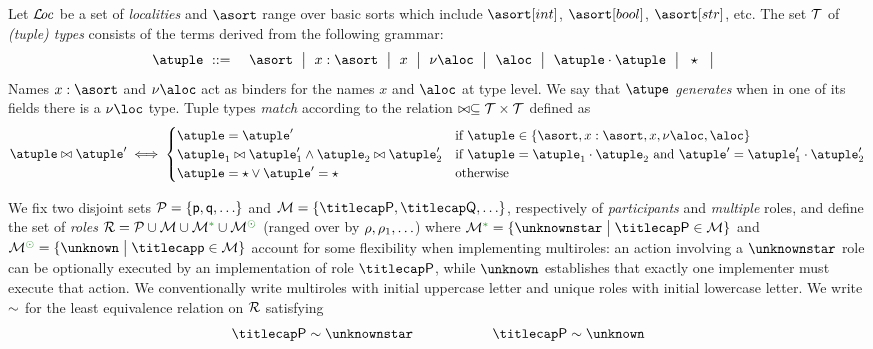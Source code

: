 %
Let $\mathcal{L}\!\mathit{oc}$ be a set of \emph{localities} and $\asort$ range over
basic sorts which include $\asort[int]$, $\asort[bool]$,
$\asort[str]$, etc.
%
The set $\mathcal{T}$ of \emph{(tuple) types} consists of the terms
derived from the following grammar:
\begin{eqnarray*}
  \atuple & \bnfdef & \asort \bnfmid
                      x : \asort \bnfmid
                      x  \bnfmid
                      \nu \aloc \bnfmid
                      \aloc \bnfmid
                      \atuple \cdot \atuple \bnfmid
                      \wildcard \bnfmid
\end{eqnarray*}
Names $x : \asort$ and $\nu \aloc$ act as binders for the names $x$
and $\aloc$ at type level.
%
We say that $\atupe$ \emph{generates} when in one of its fields there
is a $\nu \loc$ type.
%
Tuple types \emph{match} according to the relation
$\bowtie \subseteq \mathcal{T} \times \mathcal{T}$ defined as
\[
  \atuple \matches \atuple' \iff
  \begin{cases}
    \atuple = \atuple'  
    & 
    \text{if $\atuple\in\{\asort, x : \asort, x, \nu \aloc, \aloc\}$}
    \\
    \atuple_1 \matches \atuple'_1
    \land \atuple_2 \matches \atuple'_2
    &
    \text{if } \atuple = \atuple_1 \cdot \atuple_2
    \text{ and }  \atuple' = \atuple'_1 \cdot \atuple'_2
    \\
    \atuple = \wildcard \vee \atuple' = \wildcard & \text{otherwise}
  \end{cases}
\]

%

We fix two disjoint sets $\participants = \{\ptp p, \ptp q, \ldots\}$
and $\multiroles = \{\amulti P, \amulti Q, \ldots \}$, respectively of
\emph{participants} and \emph{multiple} roles, and define the set of
\emph{roles}
$\roleset = \participants \cup \multiroles \cup
\multiroles^\unknownstarop \cup \multiroles^\unknownop$ (ranged over
by $\rho, \rho_1, \ldots$) where
$\multiroles^{\unknownstarop} = \{\unknownstar \sst \amulti P
\in\multiroles\}$ and
$\multiroles^{\unknownop} = \{ \unknown \sst \amulti p \in \multiroles
\}$ account for some flexibility when implementing multiroles: an
action involving a $\unknownstar$ role can be optionally executed by
an implementation of role $\amulti P$, while $\unknown$ establishes
that exactly one implementer must execute that action.
%
We conventionally write multiroles with initial uppercase letter and
unique roles with initial lowercase letter.
%
We write $\sim$ for the least equivalence relation on $\mathcal{R}$
satisfying
\[\amulti P \eqR \unknownstar \hspace{2cm} \amulti P \eqR \unknown\]



